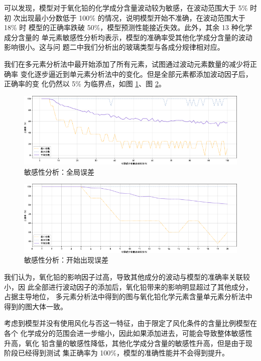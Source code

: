 \documentclass[withoutpreface,bwprint]{cumcmthesis} %
\begin{document}
可以发现，模型对于氧化铅的化学成分含量波动较为敏感，在波动范围大于 5\% 时初
次出现最小分数低于 100\% 的情况，说明模型开始不准确，在波动范围大于 18\% 时
模型的正确率跌破 50\%，模型预测性能接近失效。此外，其余 13 种化学成分含量的
单元素敏感性分析均表示，模型的准确率受其他化学成分含量的波动影响很小。这与问
题二中我们分析出的玻璃类型与各成分规律相对应。

我们在多元素分析法中最开始添加了所有元素，试图通过波动元素数量的减少将正确率
变化逐步逼近到单元素分析法中的变化。但是全部元素都添加波动因子后，正确率的变
化仍然以 5\% 为临界点，如图 \ref{fig:globalError}、图 \ref{fig:initialError}。
\begin{figure}[!htb]
    \centering
    \includegraphics{敏感性分析：全局误差.pdf}
    \caption{敏感性分析：全局误差}
    \label{fig:globalError}
\end{figure}
\begin{figure}[!htb]
    \centering
    \includegraphics{敏感性分析：开始出现误差.pdf}
    \caption{敏感性分析：开始出现误差}
    \label{fig:initialError}
\end{figure}

我们认为，氧化铅的影响因子过高，导致其他成分的波动与模型的准确率关联较小，因
此全部进行波动因子的添加后，氧化铅带来的影响明显超过了其他成分，占据主导地位，
多元素分析法中得到的图与氧化铅化学元素含量单元素分析法中得到的图大体一致。

考虑到模型并没有使用风化与否这一特征，由于限定了风化条件的含量比例模型在各个
化学成分的范围会进一步缩小，因此如果添加进去，可能会导致整体敏感性升高，氧化
铅含量的敏感性降低，其他化学成分含量的敏感性升高，但是由于现阶段已经得到测试
集正确率为 100\%，模型的准确性能并不会得到提升。
\end{document}
